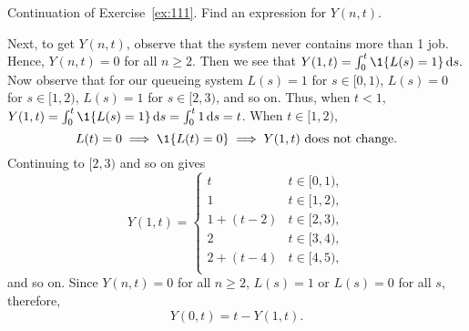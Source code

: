 \begin{exercise}\label{ex:112} Continuation of Exercise~\ref{ex:111}. 
Find an expression for $Y(n,t)$. 
    \begin{solution}
      Next, to get $Y(n,t)$, observe that the system never contains
      more than 1 job. Hence, $Y(n,t)=0$ for all $n\geq 2$.  Then we see that
      $Y(1,t) = \int_0^t \1{L(s) = 1}\d s.$ Now observe that for our
      queueing system $L(s)=1$ for $s\in[0,1)$, $L(s)=0$ for
      $s\in[1,2)$, $L(s)=1$ for $s\in[2,3)$, and so on. Thus, when
      $t<1$, $Y(1,t)=\int_0^t \1{L(s)=1} \d s = \int_0^t 1\d s = t$.
      When $t\in[1,2)$, 
      \begin{equation*}
        L(t)=0 \implies \1{L(t)=0} \implies Y(1,t) \text{ does not change}.
      \end{equation*}
Continuing to $[2,3)$ and so on gives
    \begin{equation*}
      Y(1,t) =
      \begin{cases}
        t & t\in[0,1), \\
        1 & t\in[1,2), \\
        1+(t-2) & t\in[2,3), \\
        2 & t\in[3,4), \\
        2+(t-4) & t\in[4,5), \\
      \end{cases}
    \end{equation*}
    and so on.  Since $Y(n,t)=0$ for all $n\geq 2$, $L(s) = 1$ or
    $L(s)=0$ for all $s$, therefore, 
    \begin{equation*}
      Y(0,t) = t-Y(1,t).
    \end{equation*}
    \end{solution}
\end{exercise}


